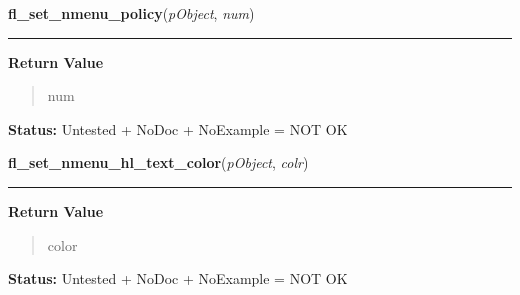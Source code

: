     \label{xformslib:library:fl_set_nmenu_policy}

    \vspace{0.5ex}

\hspace{.8\funcindent}\begin{boxedminipage}{\funcwidth}

    \raggedright \textbf{fl\_set\_nmenu\_policy}(\textit{pObject}, \textit{num})

    \vspace{-1.5ex}

    \rule{\textwidth}{0.5\fboxrule}
\setlength{\parskip}{2ex}
\setlength{\parskip}{1ex}
      \textbf{Return Value}
    \vspace{-1ex}

      \begin{quote}
      num

      \end{quote}

\textbf{Status:} Untested + NoDoc + NoExample = NOT OK



    \end{boxedminipage}

    \label{xformslib:library:fl_set_nmenu_hl_text_color}

    \vspace{0.5ex}

\hspace{.8\funcindent}\begin{boxedminipage}{\funcwidth}

    \raggedright \textbf{fl\_set\_nmenu\_hl\_text\_color}(\textit{pObject}, \textit{colr})

    \vspace{-1.5ex}

    \rule{\textwidth}{0.5\fboxrule}
\setlength{\parskip}{2ex}
\setlength{\parskip}{1ex}
      \textbf{Return Value}
    \vspace{-1ex}

      \begin{quote}
      color

      \end{quote}

\textbf{Status:} Untested + NoDoc + NoExample = NOT OK



    \end{boxedminipage}

